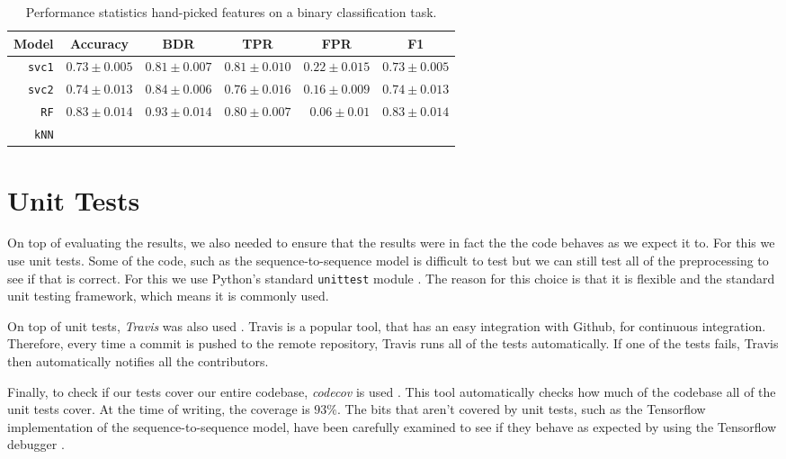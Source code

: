 \begin{table}[ht]
  \centering
  \begin{tabular}{ r  r  r  r  r  r } \hline
    \multicolumn{1}{c}{\textbf{Model}} & \multicolumn{1}{c}{\textbf{Accuracy}} & \multicolumn{1}{c}{\textbf{BDR}} & \multicolumn{1}{c}{\textbf{TPR}} &
      \multicolumn{1}{c}{\textbf{FPR}} & \multicolumn{1}{c}{\textbf{F1}} \\ \hline

    \texttt{svc1} & $0.73 \pm 0.005$ & $0.81 \pm 0.007$ & $0.81 \pm 0.010$ & $0.22 \pm 0.015$ & $0.73 \pm 0.005$ \\

    \texttt{svc2} & $0.74 \pm 0.013$ & $0.84 \pm 0.006$ & $0.76 \pm 0.016$ & $0.16 \pm 0.009$ & $0.74 \pm 0.013$ \\

    \texttt{RF} & $0.83 \pm 0.014$ & $0.93 \pm 0.014$ & $0.80 \pm 0.007$ & $0.06 \pm 0.01$ & $0.83 \pm 0.014$\\

    \texttt{kNN} & & & & & \\

    \hline
  \end{tabular}
  \caption{Performance statistics hand-picked features on a binary classification task.}
\end{table}


\section{Unit Tests}

On top of evaluating the results, we also needed to ensure that the results were in fact the the code behaves as we expect it to.
For this we use unit tests.
Some of the code, such as the sequence-to-sequence model is difficult to test but we can still test all of the preprocessing to see if that is correct.
For this we use Python's standard \texttt{unittest} module \cite{python_unittest_documentation}.
The reason for this choice is that it is flexible and the standard unit testing framework, which means it is commonly used.

On top of unit tests, \textit{Travis} was also used \cite{travis}.
Travis is a popular tool, that has an easy integration with Github, for continuous integration.
Therefore, every time a commit is pushed to the remote repository, Travis runs all of the tests automatically.
If one of the tests fails, Travis then automatically notifies all the contributors.

Finally, to check if our tests cover our entire codebase, \textit{codecov} is used \cite{codecov}.
This tool automatically checks how much of the codebase all of the unit tests cover.
At the time of writing, the coverage is $93\%$.
The bits that aren't covered by unit tests, such as the Tensorflow implementation of the sequence-to-sequence model, have been carefully examined to see if they behave as expected by using the Tensorflow debugger \cite{tensorflow}.

